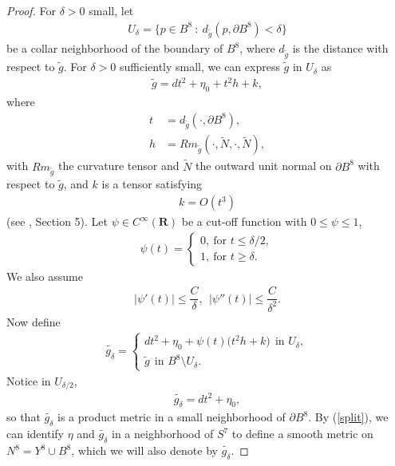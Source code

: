 \documentclass{amsart}
\newcommand{\tN}{\widetilde{N}}
\newcommand{\wtg}{\widetilde{g}}
\newcommand{\Ud}{U_{\delta}}
\newcommand{\wtd}{\widetilde{g_{\delta}}}
\theoremstyle{definition}
\theoremstyle{remark}
\numberwithin{equation}{section}
\begin{document}
\begin{proof}
For $\delta > 0$ small, let
\begin{align*} %
\Ud = \{ p \in B^8\ :\ d_{\wtg}(p,\partial B^8) < \delta \}
\end{align*}
be a collar neighborhood of the boundary of $B^8$, where $d_{\wtg}$ is the distance with respect to $\wtg$.  For $\delta > 0$ sufficiently small, we can express $\wtg$ in $\Ud$ as
\begin{align*} %
\wtg = dt^2 + \eta_0 + t^2 h + k,
\end{align*}
where
\begin{align*}  %
t &= d_{\wtg}(\cdot, \partial B^8), \\
h &= Rm_{\wtg}( \cdot, \tN, \cdot, \tN),
\end{align*}
with $Rm_{\wtg}$ the curvature tensor and $\tN$ the outward unit normal on $\partial B^8$ with respect to $\wtg$, and $k$ is a tensor satisfying
\begin{align*}
k = O(t^3)
\end{align*}
(see \cite{PS}, Section 5).  Let $\psi \in C^{\infty}(\mathbf{R})$ be a cut-off function with $0 \leq \psi \leq 1$,
\begin{align*}
\psi(t) =
\begin{cases}
0, \ \mbox{for } t \leq \delta/2, \\
1, \ \mbox{for } t \geq \delta.
\end{cases}
\end{align*}
We also assume
\begin{align} \label{Dpsi}
|\psi'(t)| \leq \dfrac{C}{\delta}, \ \ |\psi''(t)| \leq \dfrac{C}{\delta^2}.
\end{align}
Now define
\begin{align}  \label{gddef}
\wtd = \begin{cases}
dt^2 + \eta_0 + \psi(t) \big( t^2 h + k \big) \ \ \mbox{in } U_{\delta}, \\
\wtg \ \ \mbox{in } B^8 \setminus U_{\delta}.
\end{cases}
\end{align}
Notice in $U_{\delta/2}$,
\begin{align*} %
\wtd = dt^2 + \eta_0,
\end{align*}
so that $\wtd$ is a product metric in a small neighborhood of $\partial B^8$.  By (\ref{split}), we can identify $\eta$ and $\wtd$ in a neighborhood of $S^7$ to define a smooth metric on $N^8 = Y^8 \cup B^8$, which we will also denote by $\wtd$.


\end{proof}
\end{document}
